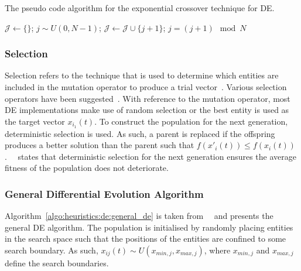 \begin{algorithm}[H]
      \caption{The pseudo code algorithm for the exponential crossover technique for \acs{DE}.}
      \label{algo:heuristics:de:exp}
      \begin{algorithmic}
            \State $\mathcal{J} \gets \{\}$;
            \State $j \sim U(0,N - 1)$;
            \Repeat
            \State $\mathcal{J} \gets \mathcal{J} \cup \{j + 1 \}$;
            \State $j = (j+1) \mod N$
      \end{algorithmic}
\end{algorithm}

\subsubsection{Selection}\label{sec:heuristics:mh:de:selection}

Selection refers to the technique that is used to determine which entities are included in the mutation operator to produce a trial vector~\cite{ref:engelbrecht:2007}. Various selection operators have been suggested~\cite{ref:storn:1996, ref:storn:1997}. With reference to the mutation operator, most \acs{DE} implementations make use of random selection or the best entity is used as the target vector $x_{i_{1}}(t)$. To construct the population for the next generation, deterministic selection is used. As such, a parent is replaced if the offspring produces a better solution than the parent such that $f(x'_{i}(t)) \leq f(x_{i}(t))$.~\citeauthor{ref:engelbrecht:2007}~\cite{ref:engelbrecht:2007} states that deterministic selection for the next generation ensures the average fitness of the population does not deteriorate.


\subsubsection{General Differential Evolution Algorithm}

Algorithm~\ref{algo:heuristics:de:general_de} is taken from~\citeauthor{ref:engelbrecht:2007}~\cite{ref:engelbrecht:2007} and presents the general \acs{DE} algorithm. The population is initialised by randomly placing entities in the search space such that the positions of the entities are confined to some search boundary. As such, $x_{ij}(t) \sim U(x_{min,j}, x_{max,j})$, where $x_{min,j}$ and $x_{max,j}$ define the search boundaries.

